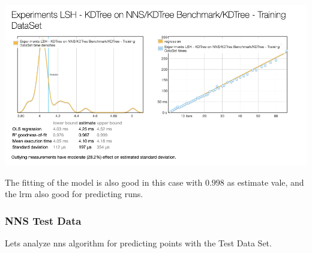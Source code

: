 \documentclass[12pt, a4paper]{article}
\begin{document}
\begin{itemize}
\begin{minipage}[t]{\linewidth}
  \includegraphics[width=\textwidth]{bench_kdt_load_training_ds}
  \captionsetup{type=figure}
  \label{fig:bench_kdt_load_training_ds}
\end{minipage}

The fitting of the model is also good in this case with $0.998$ as estimate vale, and the \acrshort{lrm} also good for predicting runs.

\end{itemize}

\subsubsection{NNS Test Data}\label{sub:sub:sec:test:results}
Lets analyze \acrshort{nns} algorithm for predicting points with the Test Data Set.
\end{document}
